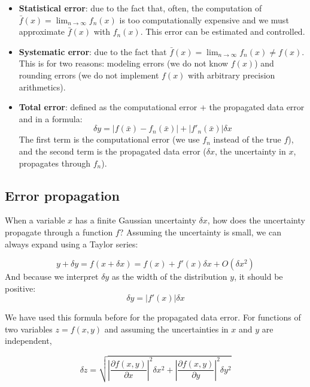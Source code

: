 \documentclass[justified,sixbynine]{tufte-book}
\theoremstyle{plain}%
\theoremstyle{definition}
\theoremstyle{remark}
\begin{document}
\begin{fullwidth}
\begin{itemize}
\item {\bf Statistical error}: due to the fact that, often, the computation of $\bar f(x) = \lim_{n\rightarrow\infty} f_n(x)$ is too computationally expensive and we must approximate $\bar f(x)$ with $f_n(x)$. This error can be estimated and controlled.

\item {\bf Systematic error}: due to the fact that $\bar f(x) = \lim_{n\rightarrow\infty} f_n(x) \neq f(x)$. This is for two reasons: modeling errors (we do not know $f(x)$) and rounding errors (we do not implement $f(x)$ with arbitrary precision arithmetics).

\item {\bf Total error}: defined as the computational error + the propagated data error and in a formula:
\begin{equation}
\delta y = |f(\bar x)-f_n(\bar x)| + |f'_n(\bar x)|\delta x
\end{equation}
The first term is the computational error (we use $f_n$ instead of the true $f$), and the second term is the propagated data error ($\delta x$, the uncertainty in $x$, propagates through $f_n$).
\end{itemize}


\goodbreak\subsection{Error propagation}


When a variable $x$ has a finite Gaussian uncertainty $\delta x$, how does the uncertainty propagate through a function $f$? Assuming the uncertainty is small, we can always expand using a Taylor series:

\begin{equation}
y+\delta y = f(x+\delta x) = f(x) + f'(x)\delta x + O(\delta x^2)
\end{equation}
And because we interpret $\delta y$ as the width of the distribution $y$, it should be positive:
\begin{equation}
  \delta y = |f'(x)|\delta x
\end{equation}

We have used this formula before for the propagated data error.
For functions of two variables $z = f(x,y)$ and assuming the uncertainties in $x$ and $y$ are independent,

\begin{equation}
  \delta z = \sqrt{\left|\frac{\partial f(x,y)}{\partial x}\right|^2\delta x^2 +
\left|\frac{\partial f(x,y)}{\partial y}\right|^2\delta y^2 }
\end{equation}


\end{fullwidth}
\end{document}
